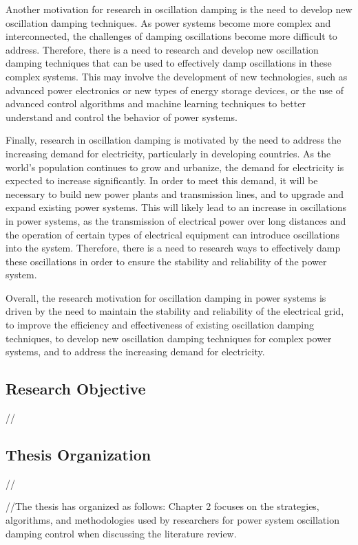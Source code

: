 \documentclass[12pt]{article}
\begin{document}
Another motivation for research in oscillation damping is the need to develop new oscillation damping techniques. As power systems become more complex and interconnected, the challenges of damping oscillations become more difficult to address. Therefore, there is a need to research and develop new oscillation damping techniques that can be used to effectively damp oscillations in these complex systems. This may involve the development of new technologies, such as advanced power electronics or new types of energy storage devices, or the use of advanced control algorithms and machine learning techniques to better understand and control the behavior of power systems.

Finally, research in oscillation damping is motivated by the need to address the increasing demand for electricity, particularly in developing countries. As the world's population continues to grow and urbanize, the demand for electricity is expected to increase significantly. In order to meet this demand, it will be necessary to build new power plants and transmission lines, and to upgrade and expand existing power systems. This will likely lead to an increase in oscillations in power systems, as the transmission of electrical power over long distances and the operation of certain types of electrical equipment can introduce oscillations into the system. Therefore, there is a need to research ways to effectively damp these oscillations in order to ensure the stability and reliability of the power system.

Overall, the research motivation for oscillation damping in power systems is driven by the need to maintain the stability and reliability of the electrical grid, to improve the efficiency and effectiveness of existing oscillation damping techniques, to develop new oscillation damping techniques for complex power systems, and to address the increasing demand for electricity.
\subsection{Research Objective}//

\subsection{Thesis Organization}//

//The thesis has organized as follows:
Chapter 2 focuses on the strategies, algorithms, and methodologies used by researchers
for power system oscillation damping control when discussing the literature review.
\end{document}
